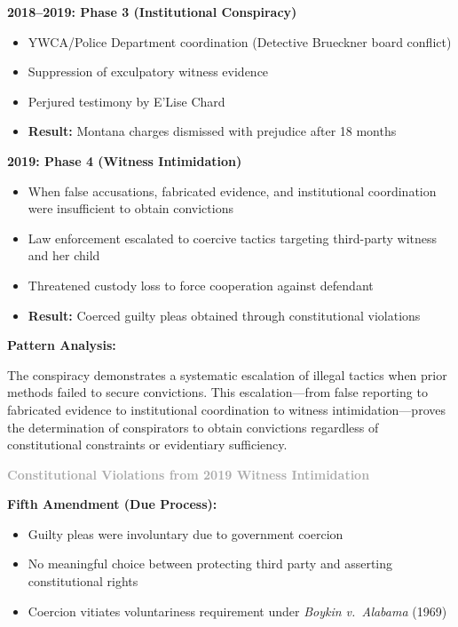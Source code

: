 \documentclass[11pt, letterpaper]{article}
\newcommand{\subsubsectiontitle}[1]{\vspace{0.1in}\noindent\textcolor{DarkGray}{\textbf{#1}}\vspace{0.05in}}
\begin{document}
\textbf{2018--2019: Phase 3 (Institutional Conspiracy)}
\begin{itemize}[leftmargin=*,itemsep=2pt]
    \item YWCA/Police Department coordination (Detective Brueckner board conflict)
    \item Suppression of exculpatory witness evidence
    \item Perjured testimony by E'Lise Chard
    \item \textbf{Result:} Montana charges dismissed with prejudice after 18 months
\end{itemize}

\textbf{2019: Phase 4 (Witness Intimidation)}
\begin{itemize}[leftmargin=*,itemsep=2pt]
    \item When false accusations, fabricated evidence, and institutional coordination were insufficient to obtain convictions
    \item Law enforcement escalated to coercive tactics targeting third-party witness and her child
    \item Threatened custody loss to force cooperation against defendant
    \item \textbf{Result:} Coerced guilty pleas obtained through constitutional violations
\end{itemize}

\textbf{Pattern Analysis:}

The conspiracy demonstrates a systematic escalation of illegal tactics when prior methods failed to secure convictions. This escalation---from false reporting to fabricated evidence to institutional coordination to witness intimidation---proves the determination of conspirators to obtain convictions regardless of constitutional constraints or evidentiary sufficiency.

\subsubsectiontitle{Constitutional Violations from 2019 Witness Intimidation}

\textbf{Fifth Amendment (Due Process):}
\begin{itemize}[leftmargin=*,itemsep=2pt]
    \item Guilty pleas were involuntary due to government coercion
    \item No meaningful choice between protecting third party and asserting constitutional rights
    \item Coercion vitiates voluntariness requirement under \textit{Boykin v.\ Alabama} (1969)
\end{itemize}
\end{document}
